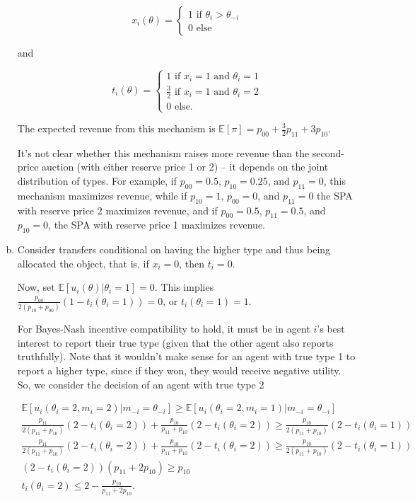 \documentclass{article}
\begin{document}
\begin{enumerate}[(a)]
	$$x_i(\theta) = \begin{cases}
		1 \text{ if } \theta_i > \theta_{-i} \\
		0 \text{ else}
	\end{cases}$$

	and

	$$t_i(\theta) = \begin{cases}
		1 \text{ if } x_i = 1 \text{ and } \theta_i = 1 \\
		\frac{3}{2} \text{ if } x_i = 1 \text{ and } \theta_i = 2 \\
		0 \text{ else.}
	\end{cases}$$

	The expected revenue from this mechanism is $\mathbb{E}[\pi] = p_{00} + \frac{3}{2}p_{11} + 3p_{10}$.

	It's not clear whether this mechanism raises more revenue than the second-price auction (with either reserve price 1 or 2) -- it depends on the joint distribution of types. For example, if $p_{00} = 0.5$, $p_{10} = 0.25$, and $p_{11} = 0$, this mechanism maximizes revenue, while if $p_{10} = 1$, $p_{00} =0$, and $p_{11} = 0$ the SPA with reserve price 2 maximizes revenue, and if $p_{00} = 0.5$, $p_{11} = 0.5$, and $p_{10} = 0$, the SPA with reserve price 1 maximizes revenue.

	\item

	Consider transfers conditional on having the higher type and thus being allocated the object, that is, if $x_i = 0$, then $t_i = 0$.

	Now, set $\mathbb{E}[u_i(\theta) | \theta_i =1] = 0$. This implies $\frac{p_{00}}{2(p_{10} + p_{00})}(1 - t_i(\theta_i = 1)) = 0$, or $t_i(\theta_i = 1) = 1$.

	For Bayes-Nash incentive compatibility to hold, it must be in agent $i$'s best interest to report their true type (given that the other agent also reports truthfully). Note that it wouldn't make sense for an agent with true type 1 to report a higher type, since if they won, they would receive negative utility. So, we consider the decision of an agent with true type 2

	\begin{gather*}
	\mathbb{E}[u_i(\theta_i = 2, m_i = 2) | m_{-i} = \theta_{-i}] \geq  \mathbb{E}[u_i(\theta_i = 2, m_i = 1) | m_{-i} = \theta_{-i}] \\
	\frac{p_{11}}{2(p_{11} + p_{10})}(2-t_i(\theta_i = 2)) + \frac{p_{10}}{p_{11} + p_{10}}(2-t_i(\theta_i = 2)) \geq \frac{p_{10}}{2(p_{11} + p_{10})}(2-t_i(\theta_i = 1)) \\
	\frac{p_{11}}{2(p_{11} + p_{10})}(2-t_i(\theta_i = 2)) + \frac{p_{10}}{p_{11} + p_{10}}(2-t_i(\theta_i = 2)) \geq \frac{p_{10}}{2(p_{11} + p_{10})}(2-t_i(\theta_i = 1)) \\
	(2-t_i(\theta_i = 2))(p_{11} + 2p_{10}) \geq p_{10} \\
	t_i(\theta_i = 2) \leq 2 - \frac{p_{10}}{p_{11} + 2p_{10}}.
	\end{gather*}


\end{enumerate}
\end{document}
